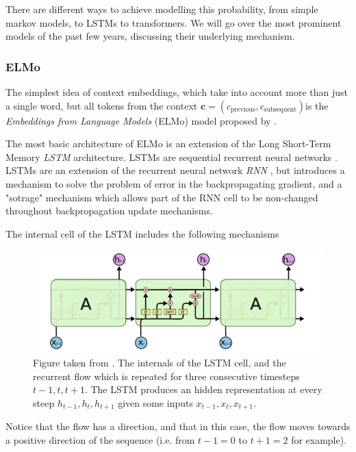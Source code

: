 \documentclass[a4paper,12pt,twoside,openright]{report}
\begin{document}
There are different ways to achieve modelling this probability, from simple markov models, to LSTMs to transformers.
We will go over the most prominent models of the past few years, discussing their underlying mechanism.

\subsubsection{ELMo}


The simplest idea of context embeddings, which take into account more than just a single word, but all tokens from the context $\mathbf{c} = (c_\text{previous}, c_\text{subsequent}) $is the \textit{Embeddings from Language Models} (ELMo) model proposed by \cite{peters17b}.

The most basic architecture of ELMo is an extension of the Long Short-Term Memory \textit{LSTM} architecture.
LSTMs are sequential recurrent neural networks \cite{hochreiter97}.
LSTMs are an extension of the recurrent neural network \textit{RNN} \cite{rumelhart85}, but introduces a mechanism to solve the problem of error in the backpropagating gradient, and a "sotrage" mechanism which allows part of the RNN cell to be non-changed throughout backpropagation update mechanisms.

The internal cell of the LSTM includes the following mechanisms

\begin{figure}[h]
	\center
  \includegraphics[width=\linewidth]{./assets/background/LSTM.png}
  \caption{Figure taken from \cite{colahLSTM}. The internals of the LSTM cell, and the recurrent flow which is repeated for three consecutive timesteps $t-1, t, t+1$. 
  The LSTM produces an hidden representation at every steep $h_{t-1}, h_{t}, h_{t+1}$ given some inputs $x_{t-1}, x_t, x_{t+1}$.
  }
  \label{fig:lstm_internals}
\end{figure}

Notice that the flow has a direction, and that in this case, the flow moves towards a positive direction of the sequence (i.e. from $t-1 = 0$ to $t + 1 = 2$ for example).
\end{document}
